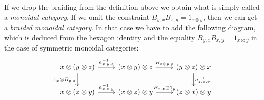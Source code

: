 \documentclass[TFM.tex]{subfiles}
\begin{document}
If we drop the braiding from the definition above we obtain what is simply called a \emph{monoidal category}. If we omit the constraint $B_{y,x}B_{x,y}=1_{x\otimes y}$, then we can get a \emph{braided monoidal category}. In that case we have to add the following diagram, which is deduced from the hexagon identity and the equality $B_{y,x}B_{x,y}=1_{x\otimes y}$ in the case of symmetric monoidal categories:
\[
\begin{tikzcd}
	x\otimes (y\otimes z) \arrow[r, "{a^{-1}_{x,y,z}}"] \arrow[d, "{1_x\otimes B_{y,z}}"'] & (x\otimes y)\otimes z \arrow[r, "{B_{x\otimes y, z}}"]   & (y\otimes z)\otimes x \arrow[d, "{a^{-1}_{z,x,y}}"] \\
	x\otimes (z\otimes y) \arrow[r, "{a^{-1}_{x,z,y}}"]                                    & (x\otimes z)\otimes y \arrow[r, "{B_{x,z}\otimes 1_y}"] & (z\otimes x)\otimes y                         
\end{tikzcd}
\]
\end{document}
